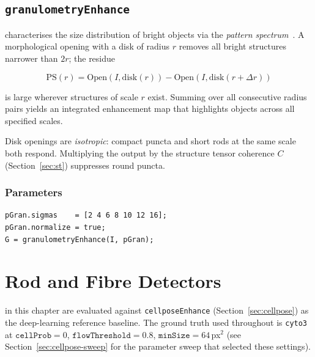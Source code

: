 \documentclass[a4paper, justified]{tufte-book}
\begin{document}
\section{\texttt{granulometryEnhance}}
\label{sec:gran}

 characterises the size distribution of bright objects
via the \emph{pattern spectrum}~\cite{Maragos1989,Serra1982}.  A morphological
opening with a disk of radius $r$ removes all bright structures narrower than
$2r$; the residue

\begin{equation}
  \mathrm{PS}(r) = \mathrm{Open}(I, \mathrm{disk}(r))
                 - \mathrm{Open}(I, \mathrm{disk}(r{+}\Delta r))
\end{equation}

is large wherever structures of scale $r$ exist.  Summing over all consecutive
radius pairs yields an integrated enhancement map that highlights objects across
all specified scales.

Disk openings are \emph{isotropic}: compact puncta and short rods at the same
scale both respond.  Multiplying the output by the structure tensor coherence
$C$ (Section~\ref{sec:st}) suppresses round puncta.

\subsection*{Parameters}

\begin{lstlisting}
pGran.sigmas    = [2 4 6 8 10 12 16];
pGran.normalize = true;
G = granulometryEnhance(I, pGran);
\end{lstlisting}

\chapter{Rod and Fibre Detectors}
\label{ch:rods}

 in this chapter are evaluated against
\texttt{cellposeEnhance} (Section~\ref{sec:cellpose}) as the deep-learning
reference baseline.  The ground truth used throughout is \texttt{cyto3} at
$\mathtt{cellProb}=0$, $\mathtt{flowThreshold}=0.8$,
$\mathtt{minSize}=64$\,px$^2$ (see Section~\ref{sec:cellpose-sweep} for the
parameter sweep that selected these settings).
\end{document}
